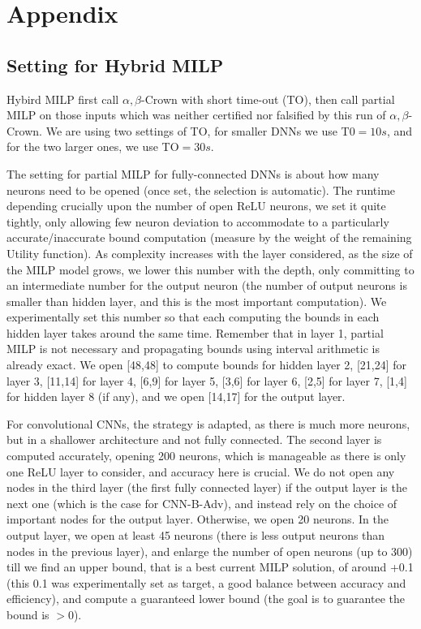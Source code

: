 \section*{Appendix}

\subsection*{Setting for Hybrid MILP}

Hybird MILP first call $\alpha,\beta$-Crown with short time-out (TO), then call partial MILP on those inputs which was neither certified nor falsified by this run of $\alpha,\beta$-Crown. We are using two settings of TO, for smaller DNNs we use T0$=10s$, and for the two larger ones, we use TO$=30s$.

The setting for partial MILP for fully-connected DNNs is about how many neurons need to be opened (once set, the selection is automatic). The runtime depending crucially upon the number of open ReLU neurons, we set it quite tightly, only allowing few neuron deviation to accommodate to a particularly accurate/inaccurate bound computation (measure by the weight of the remaining Utility function). As complexity increases with the layer considered, as the size of the MILP model grows, we lower this number with the depth, only committing to an intermediate number for the output neuron (the number of output neurons  is smaller than hidden layer, and this is the most important computation). We experimentally set this number so that each computing the bounds in each hidden layer takes around the same time. Remember that in layer 1, partial MILP is not necessary and propagating bounds using interval arithmetic is already exact. We open [48,48] to compute bounds for hidden layer 2, [21,24] for layer 3, [11,14] for layer 4, [6,9] for layer 5, [3,6] for layer 6, [2,5] for layer 7, [1,4] for hidden layer 8 (if any), and we open [14,17] for the output layer.

For convolutional CNNs, the strategy is adapted, as there is much more neurons, but in a shallower architecture and not fully connected. 
The second layer is computed accurately, opening 200 neurons, which is manageable as there is only one ReLU layer to consider, and accuracy here is crucial.
We do not open any nodes in the third layer (the first fully connected layer) if the output layer is the next one (which is the case for CNN-B-Adv), and instead rely on the choice of important nodes for the output layer. Otherwise, we open 20 neurons.
In the output layer, we open at least 45 neurons (there is less output neurons than nodes in the previous layer), and enlarge the number of open neurons (up to 300) till we find an upper bound, that is a best current MILP solution, of around +0.1 (this 0.1 was experimentally set as target, a good balance between accuracy and efficiency), and compute a guaranteed lower bound (the goal is to guarantee the bound is $>0$).

